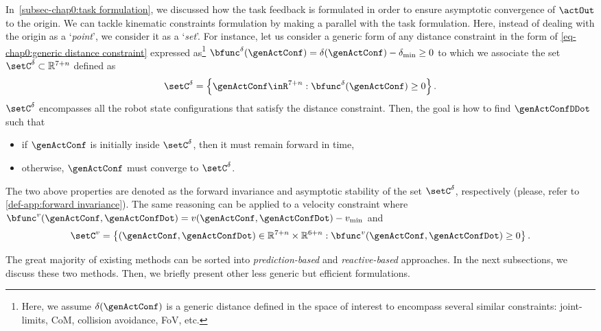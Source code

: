In~\cref{subsec-chap0:task formulation}, we discussed how the task feedback is formulated in order to ensure asymptotic convergence of $\actOut$ to the origin. We can tackle kinematic constraints formulation by making a parallel with the task formulation. Here, instead of dealing with the origin as a ‘\emph{point}’, we consider it as a ‘\emph{set}’. For instance, let us consider a generic form of any distance constraint in the form of \cref{eq-chap0:generic distance constraint} expressed as\footnote{Here, we assume $\delta(\genActConf)$ is a generic distance defined in the space of interest to encompass several similar constraints: joint-limits, CoM, collision avoidance, FoV, etc.}  $\bfunc^{\delta}(\genActConf)=\delta(\genActConf) - \delta_{\min}\geq0$ to which we associate the set $\setC^{\delta}\subset\mathbb{R}^{7+n}$ defined as 
\begin{equation}\label{eq-chap0:set C}
	\setC^{\delta} = \left\{\genActConf\inR^{7+n}: \bfunc^{\delta}(\genActConf) \geq0\right\}.
\end{equation}
$\setC^{\delta}$ encompasses all the robot state configurations that satisfy the distance constraint. Then, the goal is how to find $\genActConfDDot$ such that 
\begin{itemize}
	\item  if $\genActConf$ is initially inside $\setC^{\delta}$, then it must remain  forward in time,
	\item otherwise, $\genActConf$ must converge to $\setC^{\delta}$. 
\end{itemize}
The two above properties are denoted as the forward invariance and asymptotic stability of the set $\setC^{\delta}$, respectively (please, refer to \cref{def-app:forward invariance}). The same reasoning can be applied to a velocity constraint where $\bfunc^{v}(\genActConf,\genActConfDot) = v(\genActConf,\genActConfDot) - v_{\min}$ and
\begin{equation}\label{eq-chap0:set C - vel}
	\setC^{v} = \left\{(\genActConf,\genActConfDot)\in\mathbb{R}^{7+n}\times\mathbb{R}^{6+n}: \bfunc^{v}(\genActConf,\genActConfDot)\geq0\right\}.
\end{equation}

The great majority of existing methods can be sorted into \emph{prediction-based} and \emph{reactive-based}  approaches. In the next subsections, we discuss these two methods. Then, we briefly present other less generic but efficient formulations.%
